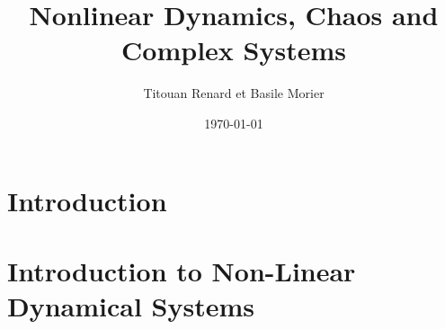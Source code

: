 \documentclass[11pt]{article}
\title{Nonlinear Dynamics, Chaos and Complex Systems}
\date{\today}
\author{Titouan Renard et Basile Morier}
\begin{document}
\maketitle	

\section{Introduction}

\newpage

\section{Introduction to Non-Linear Dynamical Systems}

\newpage
\end{document}
